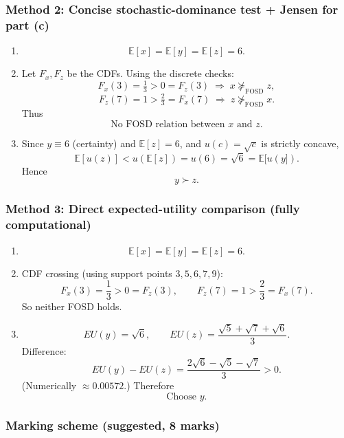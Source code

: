 \documentclass[12pt]{article}
\begin{document}
\subsubsection*{Method 2: Concise stochastic-dominance test + Jensen for part (c)}

\begin{enumerate}[label=(\alph*)]
\item
\[
\mathbb E[x]=\mathbb E[y]=\mathbb E[z]=6.
\]

\item Let \(F_x,F_z\) be the CDFs. Using the discrete checks:
\[
F_x(3)=\tfrac13>0=F_z(3) \;\Rightarrow\; x \not\succeq_{\text{FOSD}} z,
\]
\[
F_z(7)=1>\tfrac23=F_x(7) \;\Rightarrow\; z \not\succeq_{\text{FOSD}} x.
\]
Thus
\[
\boxed{\text{No FOSD relation between }x\text{ and }z.}
\]

\item Since \(y\equiv 6\) (certainty) and \(\mathbb E[z]=6\), and \(u(c)=\sqrt c\) is strictly concave,
\[
\mathbb E[u(z)]<u(\mathbb E[z])=u(6)=\sqrt6=\mathbb E[u(y]).
\]
Hence
\[
\boxed{y \succ z.}
\]
\end{enumerate}

\subsubsection*{Method 3: Direct expected-utility comparison (fully computational)}

\begin{enumerate}[label=(\alph*)]
\item
\[
\boxed{\mathbb E[x]=\mathbb E[y]=\mathbb E[z]=6.}
\]

\item CDF crossing (using support points \(3,5,6,7,9\)):
\[
F_x(3)=\frac13>0=F_z(3),\qquad F_z(7)=1>\frac23=F_x(7).
\]
So neither FOSD holds.

\item
\[
EU(y)=\sqrt6,
\qquad
EU(z)=\frac{\sqrt5+\sqrt7+\sqrt6}{3}.
\]
Difference:
\[
EU(y)-EU(z)=\frac{2\sqrt6-\sqrt5-\sqrt7}{3}>0.
\]
(Numerically \(\approx 0.00572\).) Therefore
\[
\boxed{\text{Choose }y.}
\]
\end{enumerate}
\vspace{2cm}
\subsubsection*{Marking scheme (suggested, 8 marks)}
\end{document}
